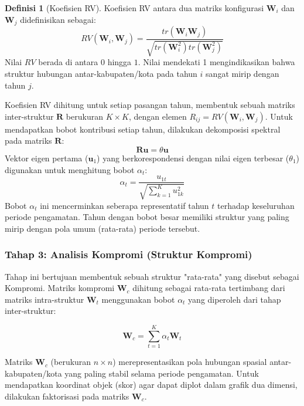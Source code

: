 \documentclass[a4paper]{article}
\theoremstyle{definition} %
\newtheorem{definition}{Definisi}[section]
\begin{document}
\begin{definition}[Koefisien RV]
	Koefisien RV antara dua matriks konfigurasi $\mathbf{W}_i$ dan $\mathbf{W}_j$ didefinisikan sebagai:
	\begin{equation}
		RV(\mathbf{W}_i, \mathbf{W}_j) = \frac{tr(\mathbf{W}_i \mathbf{W}_j)}{\sqrt{tr(\mathbf{W}_i^2) tr(\mathbf{W}_j^2)}}
	\end{equation}
	Nilai $RV$ berada di antara $0$ hingga $1$. Nilai mendekati 1 mengindikasikan bahwa struktur hubungan antar-kabupaten/kota pada tahun $i$ sangat mirip dengan tahun $j$.
\end{definition}

Koefisien RV dihitung untuk setiap pasangan tahun, membentuk sebuah matriks inter-struktur $\mathbf{R}$ berukuran $K \times K$, dengan elemen $R_{ij} = RV(\mathbf{W}_i, \mathbf{W}_j)$. Untuk mendapatkan bobot kontribusi setiap tahun, dilakukan dekomposisi spektral pada matriks $\mathbf{R}$:
\begin{equation}
	\mathbf{R} \mathbf{u} = \theta \mathbf{u}
\end{equation}
Vektor eigen pertama ($\mathbf{u}_1$) yang berkorespondensi dengan nilai eigen terbesar ($\theta_1$) digunakan untuk menghitung bobot $\alpha_t$:
\begin{equation}
	\alpha_t = \frac{u_{1t}}{\sqrt{\sum_{k=1}^{K} u_{1k}^2}}
\end{equation}
Bobot $\alpha_t$ ini mencerminkan seberapa representatif tahun $t$ terhadap keseluruhan periode pengamatan. Tahun dengan bobot besar memiliki struktur yang paling mirip dengan pola umum (rata-rata) periode tersebut.

\subsubsection{Tahap 3: Analisis Kompromi (Struktur Kompromi)}

Tahap ini bertujuan membentuk sebuah struktur "rata-rata" yang disebut sebagai Kompromi. Matriks kompromi $\mathbf{W}_c$ dihitung sebagai rata-rata tertimbang dari matriks intra-struktur $\mathbf{W}_t$ menggunakan bobot $\alpha_t$ yang diperoleh dari tahap inter-struktur:

\begin{equation}
	\mathbf{W}_c = \sum_{t=1}^{K} \alpha_t \mathbf{W}_t
\end{equation}

Matriks $\mathbf{W}_c$ (berukuran $n \times n$) merepresentasikan pola hubungan spasial antar-kabupaten/kota yang paling stabil selama periode pengamatan. Untuk mendapatkan koordinat objek (skor) agar dapat diplot dalam grafik dua dimensi, dilakukan faktorisasi pada matriks $\mathbf{W}_c$.
\end{document}
